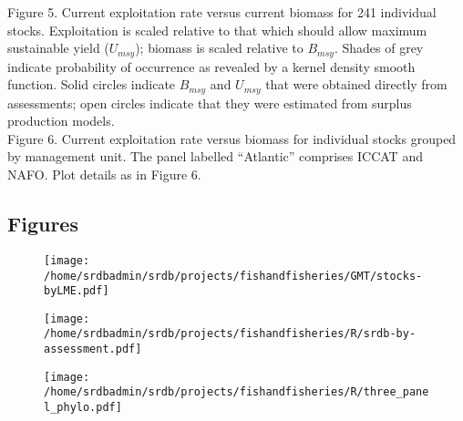\noindent Figure 5. Current exploitation rate versus current biomass for 241
individual stocks. Exploitation is scaled relative to that which
should allow maximum sustainable yield ($U_{msy}$); biomass is scaled
relative to $B_{msy}$. Shades of grey indicate probability of occurrence as
revealed by a kernel density smooth function. Solid circles indicate
$B_{msy}$ and $U_{msy}$ that were obtained directly from assessments; open circles
indicate that they were estimated from surplus production models.\\ 

\noindent Figure 6. Current exploitation rate versus biomass for
individual stocks grouped by management unit. The panel labelled
``Atlantic'' comprises ICCAT and NAFO. Plot details as in
Figure 6.\\


\newpage
\subsection*{Figures}

\begin{figure}
\begin{center}
\texttt{[image: /home/srdbadmin/srdb/projects/fishandfisheries/GMT/stocks-byLME.pdf]}
\end{center}
\caption{ }\label{fig:lmes}
\end{figure}

\begin{figure}
\begin{center}
\texttt{[image: /home/srdbadmin/srdb/projects/fishandfisheries/R/srdb-by-assessment.pdf]} %
\end{center}
\caption{ }\label{fig:taxo:srdb}
\end{figure}


\begin{figure}
\begin{center}
\texttt{[image: /home/srdbadmin/srdb/projects/fishandfisheries/R/three\_panel\_phylo.pdf]} %
\end{center}
\caption{ }\label{fig:taxo:threepanel}
\end{figure}


